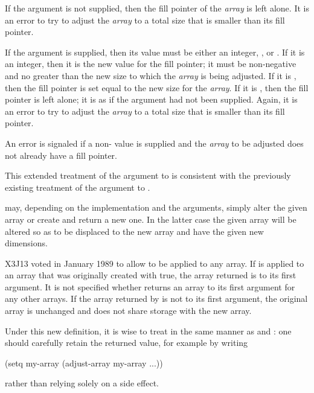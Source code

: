 \begin{defun}[Function]
\begin{new}
If the  argument is not supplied, then the fill pointer
of the \emph{array} is left alone.  It is an error
to try to adjust the \emph{array} to a total size that is smaller
than its fill pointer.

If the  argument is supplied, then its value
must be either an integer, \true, or \false.  If it is an integer,
then it is the new value for the fill pointer;
it must be non-negative and no greater than the new size to which the
\emph{array} is being adjusted.
If it is \true, then the fill pointer is set equal to the new size
for the \emph{array}.  If it is \false, then the fill pointer is
left alone; it is as if the argument had not been supplied.
Again, it is an error
to try to adjust the \emph{array} to a total size that is smaller
than its fill pointer.

An error is signaled if a non-{\false}  value
is supplied and the \emph{array} to be adjusted does not already
have a fill pointer.

This extended treatment of the 
argument to  is consistent with the previously
existing treatment of the  argument to .
\end{new}

 may, depending on the implementation and the arguments,
simply alter the given array or create and return a new one.
In the latter case the given array will be altered so as to be displaced
to the new array and have the given new dimensions.

\begin{newer}
X3J13 voted in January 1989
to allow  to be applied to any array.
If  is applied to an array that was
originally created with  true,
the array returned is  to its first argument.  It is not specified
whether  returns an array  to its first argument for any
other arrays.  If the array returned by  is not  to its
first argument, the original array is unchanged and does not share
storage with the new array.

Under this new definition, it is wise to treat 
in the same manner as  and : one should carefully
retain the returned value, for example by writing
\begin{lisp}
(setq my-array (adjust-array my-array ...))
\end{lisp}
rather than relying solely on a side effect.
\end{newer}


\end{defun}
